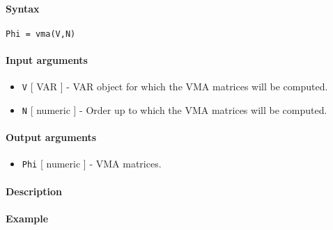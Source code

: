 


	\paragraph{Syntax}\label{syntax}

\begin{verbatim}
Phi = vma(V,N)
\end{verbatim}

\paragraph{Input arguments}\label{input-arguments}

\begin{itemize}
\item
  \texttt{V} {[} VAR {]} - VAR object for which the VMA matrices will be
  computed.
\item
  \texttt{N} {[} numeric {]} - Order up to which the VMA matrices will
  be computed.
\end{itemize}

\paragraph{Output arguments}\label{output-arguments}

\begin{itemize}
\itemsep1pt\parskip0pt
\item
  \texttt{Phi} {[} numeric {]} - VMA matrices.
\end{itemize}

\paragraph{Description}\label{description}

\paragraph{Example}\label{example}


